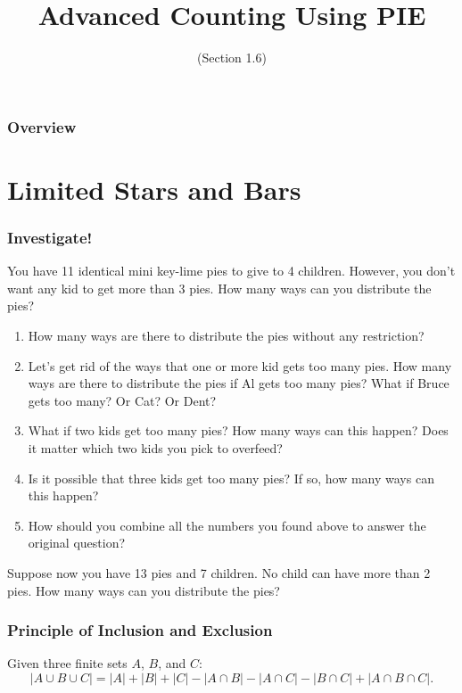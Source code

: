\documentclass[11pt, compress]{beamer}
\title{Advanced Counting Using PIE}
\subtitle{(Section 1.6)}
\author{}
\date[]{}
\begin{document}
\begin{frame}
\maketitle 
\end{frame}
 
\begin{frame}
\frametitle{Overview}
\tableofcontents 
\end{frame}
 

\section{Limited Stars and Bars}
\begin{frame}
\frametitle{Investigate!}
 You have 11 identical mini key-lime pies to give to 4 children. However, you don't want any kid to get more than 3 pies. How many ways can you distribute the pies?\begin{enumerate}
\item{} How many ways are there to distribute the pies without any restriction?


\item{} Let's get rid of the ways that one or more kid gets too many pies. How many ways are there to distribute the pies if Al gets too many pies? What if Bruce gets too many? Or Cat? Or Dent?


\item{} What if two kids get too many pies? How many ways can this happen? Does it matter which two kids you pick to overfeed?


\item{} Is it possible that three kids get too many pies? If so, how many ways can this happen?


\item{} How should you combine all the numbers you found above to answer the original question?

\end{enumerate}

 Suppose now you have 13 pies and 7 children. No child can have more than 2 pies. How many ways can you distribute the pies?
\end{frame}
 
\begin{frame}
\frametitle{Principle of Inclusion and Exclusion}
 Given three finite sets \(A\), \(B\), and \(C\):%
\begin{equation*}
|A \cup B \cup C| = |A| + |B| + |C| - |A \cap B| - |A \cap C| - |B \cap C| + |A\cap B \cap C|\text{.}
\end{equation*}

\end{frame}
 
\end{document}
